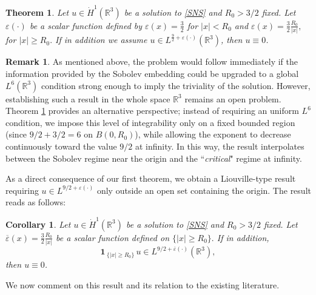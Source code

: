 \documentclass[a4paper,12pt]{amsart}
\theoremstyle{definition}
\newtheorem{remark}{Remark}[section]
\theoremstyle{plain}
\newtheorem{theorem}{Theorem}[section]
\newtheorem{corollary}{Corollary}[section]
\def\R{\mathbb{R}}
\def\R{\mathbb R}
\begin{document}
\begin{theorem}\label{thmpexplicit}
 Let $u \in \dot{H}^1(\mathbb{R}^3)$ be a   solution to \eqref{SNS} and $R_0>3/2$ fixed. Let $\varepsilon(\cdot)$ be a scalar function defined by  $\varepsilon(x)=\frac 32 $ for $|x|< R_0$ and $\varepsilon(x)=  \frac{3}{2} \frac{R_0}{|x|},$ for $|x| \geq  R_0.$ 
If in addition we assume  $u \in L^{\frac{9}{2}+\varepsilon(\cdot)}(\mathbb{R}^3)$, then $u \equiv 0$.
\end{theorem}


 \begin{remark}
As mentioned above, the problem would follow immediately if the
information provided by the Sobolev embedding could be upgraded to a
global $L^6(\mathbb{R}^3)$ condition strong enough to imply the
triviality of the solution. However, establishing such a result in the
whole space $\R^3$ remains an open problem. 
Theorem \ref{thmpexplicit} provides an alternative perspective; instead of requiring an uniform $L^6$ condition, we impose this level of integrability only on a fixed bounded region (since $9/2 + 3/2 = 6$ on $B(0,R_0)$), while allowing the exponent to decrease continuously toward the  value $9/2$ at infinity. In this way, the result interpolates between the Sobolev regime near the origin and the ``{\it critical}" regime at infinity.
\end{remark}

As a direct consequence of our first theorem, we obtain a Liouville-type result requiring $u \in L^{9/2 + \varepsilon(\cdot)}$ only outside an open set containing the origin. The result reads as follows:
\begin{corollary}\label{corollary-localized-assumption}
 Let $u \in \dot{H}^1(\mathbb{R}^3)$ be a   solution to \eqref{SNS} and $R_0>3/2$ fixed. Let $\overline \varepsilon(x)=  \frac  3 2 \frac{R_0}{|x|}$ be a scalar function defined on  $\{ |x| \geq  R_0 \}.$ 
If in addition, 
\[
\mathbf{1}_{\ \{ |x| \geq  R_0 \}  } \, u \in L^{9/2 + \overline \varepsilon(\cdot)}(\mathbb{R}^3),
\]
then $u \equiv 0$.
\end{corollary}

 

\noindent We now comment on this result and its relation to the existing literature.
\end{document}

